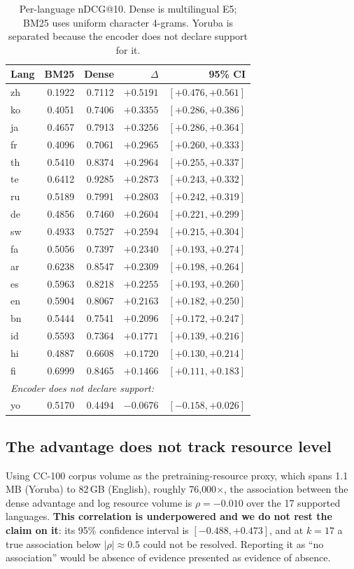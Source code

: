 \documentclass{ijimai_article}
\begin{document}
\begin{table}[t]
\caption{Per-language nDCG@10. Dense is multilingual E5; BM25 uses uniform
character 4-grams. Yoruba is separated because the encoder does not declare
support for it.}
\label{tab:main}
\centering
\small
\begin{tabular}{lrrrr}
\toprule
Lang & BM25 & Dense & $\Delta$ & 95\% CI \\
\midrule
zh & 0.1922 & 0.7112 & $+0.5191$ & $[+0.476, +0.561]$ \\
ko & 0.4051 & 0.7406 & $+0.3355$ & $[+0.286, +0.386]$ \\
ja & 0.4657 & 0.7913 & $+0.3256$ & $[+0.286, +0.364]$ \\
fr & 0.4096 & 0.7061 & $+0.2965$ & $[+0.260, +0.333]$ \\
th & 0.5410 & 0.8374 & $+0.2964$ & $[+0.255, +0.337]$ \\
te & 0.6412 & 0.9285 & $+0.2873$ & $[+0.243, +0.332]$ \\
ru & 0.5189 & 0.7991 & $+0.2803$ & $[+0.242, +0.319]$ \\
de & 0.4856 & 0.7460 & $+0.2604$ & $[+0.221, +0.299]$ \\
sw & 0.4933 & 0.7527 & $+0.2594$ & $[+0.215, +0.304]$ \\
fa & 0.5056 & 0.7397 & $+0.2340$ & $[+0.193, +0.274]$ \\
ar & 0.6238 & 0.8547 & $+0.2309$ & $[+0.198, +0.264]$ \\
es & 0.5963 & 0.8218 & $+0.2255$ & $[+0.193, +0.260]$ \\
en & 0.5904 & 0.8067 & $+0.2163$ & $[+0.182, +0.250]$ \\
bn & 0.5444 & 0.7541 & $+0.2096$ & $[+0.172, +0.247]$ \\
id & 0.5593 & 0.7364 & $+0.1771$ & $[+0.139, +0.216]$ \\
hi & 0.4887 & 0.6608 & $+0.1720$ & $[+0.130, +0.214]$ \\
fi & 0.6999 & 0.8465 & $+0.1466$ & $[+0.111, +0.183]$ \\
\midrule
\multicolumn{5}{l}{\emph{Encoder does not declare support:}} \\
yo & 0.5170 & 0.4494 & $-0.0676$ & $[-0.158, +0.026]$ \\
\bottomrule
\end{tabular}
\end{table}

\subsection{The advantage does not track resource level}
Using CC-100 corpus volume as the pretraining-resource proxy, which spans
1.1\,MB (Yoruba) to 82\,GB (English), roughly 76{,}000$\times$, the association
between the dense advantage and log resource volume is
$\rho = -0.010$ over the 17 supported languages. \textbf{This correlation is
underpowered and we do not rest the claim on it}: its 95\% confidence interval is
$[-0.488, +0.473]$, and at $k{=}17$ a true association below $|\rho| \approx 0.5$
could not be resolved. Reporting it as ``no association'' would be absence of
evidence presented as evidence of absence.
\end{document}
